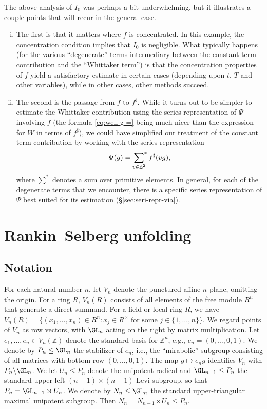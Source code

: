 The above analysis of $I_0$ was perhaps a bit underwhelming, but it illustrates a couple points that will recur in the general case.
\begin{enumerate}[(i)]
\item The first is that it matters where $f$ is concentrated.  In this example, the concentration condition implies that $I_0$ is negligible.  What typically happens (for the various ``degenerate'' terms intermediary between the constant term contribution and the ``Whittaker term'') is that the concentration properties of $f$ yield a satisfactory estimate in certain cases (depending upon $t$, $T$ and other variables), while in other cases, other methods succeed.
\item The second is the passage from $f$ to $f^\sharp$.  While it turns out to be simpler to estimate the Whittaker contribution using the series representation of $\Psi$ involving $f$ (the formula \eqref{eq:well-g-=} being much nicer than the expression for $W$ in terms of $f^\sharp$), we could have simplified our treatment of the constant term contribution by working with the series representation
  \begin{equation*}
    \Psi(g) =
    \sideset{}{^*}\sum_{v \in \mathbb{Z}^2} f^\sharp (v g),
  \end{equation*}
  where $\sum^\ast$ denotes a sum over primitive elements.  In general, for each of the degenerate terms that we encounter, there is a specific series representation of $\Psi$ best suited for its estimation (\S\ref{sec:seri-repr-via}).
\end{enumerate}






\section{Rankin--Selberg unfolding}\label{sec:rank-selb-unfold}

\subsection{Notation}\label{sec:notation-rs-unfolding}
For each natural number $n$, let $V_n$ denote the punctured affine $n$-plane, omitting the origin.  For a ring $R$, $V_n(R)$ consists of all elements of the free module $R^n$ that generate a direct summand.  For a field or local ring $R$, we have $V_n(R) = \{(x_1,\dotsc,x_n) \in R^n : x_j \in R^\times \text{ for some } j \in \{1,\dotsc,n\}\}$.  We regard points of $V_n$ as row vectors, with $\GL_n$ acting on the right by matrix multiplication.  Let $e_1,\dotsc,e_n \in V_n(\mathbb{Z})$ denote the standard basis for $\mathbb{Z}^n$, e.g., $e_n = (0,\dotsc,0,1)$.  We denote by $P_n \leq \GL_n$ the stabilizer of $e_n$, i.e., the ``mirabolic'' subgroup consisting of all matrices with bottom row $(0,\dotsc,0,1)$.  The map $g \mapsto e_n g$ identifies $V_n$ with $P_n \backslash \GL_n$.  We let $U_n \leq P_n$ denote the unipotent radical and $\GL_{n-1} \leq P_n$ the standard upper-left $(n-1) \times (n-1)$ Levi subgroup, so that $P_n = \GL_{n-1} \rtimes U_n$.  We denote by $N_n \leq \GL_n$ the standard upper-triangular maximal unipotent subgroup.  Then $N_n = N_{n-1} \rtimes U_n \leq P_n$.

